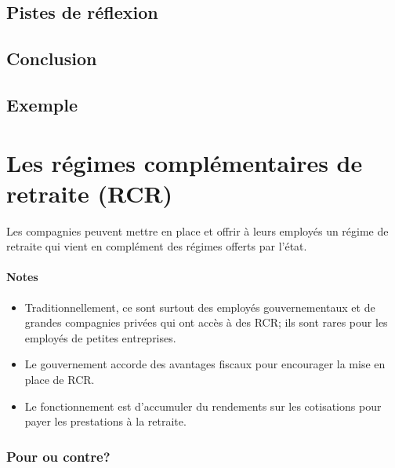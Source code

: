 \documentclass[10pt, french]{article}
\begin{document}
\begin{multicols*}{3}
\subsection*{Pistes de réflexion}

\subsection*{Conclusion}

\subsection*{Exemple}

\newpage

\section{Les régimes complémentaires de retraite (RCR)}

\begin{definitionNOHFILL}
Les compagnies peuvent mettre en place et offrir à leurs employés un régime de retraite qui vient en complément des régimes offerts par l'état. 

\paragraph{Notes}
\begin{itemize}[leftmargin = *]
	\item	Traditionnellement, ce sont surtout des employés gouvernementaux et de grandes compagnies privées qui ont accès à des RCR; ils sont rares pour les employés de petites entreprises.
	\item	Le gouvernement accorde des avantages fiscaux pour encourager la mise en place de RCR.
	\item	Le fonctionnement est d'accumuler du rendements sur les cotisations pour payer les prestations à la retraite.
\end{itemize}
\end{definitionNOHFILL}

\subsubsection*{Pour ou contre?}


\end{multicols*}
\end{document}
